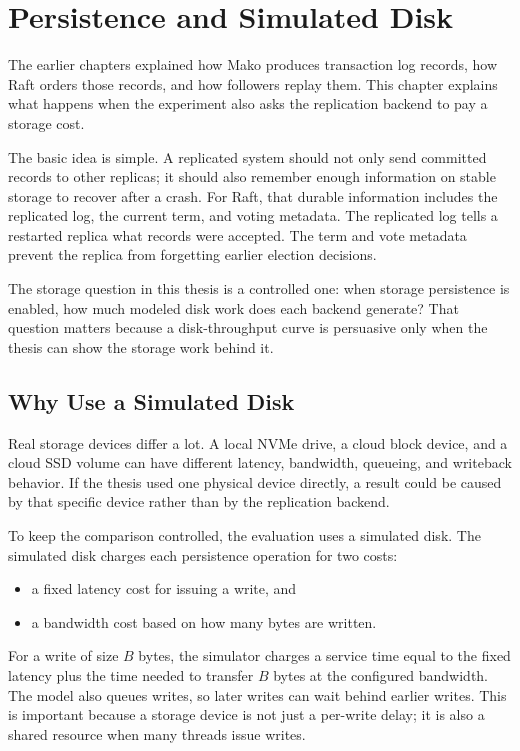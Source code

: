 \chapter{Persistence and Simulated Disk}

The earlier chapters explained how Mako produces transaction log records, how
Raft orders those records, and how followers replay them. This chapter explains
what happens when the experiment also asks the replication backend to pay a
storage cost.

The basic idea is simple. A replicated system should not only send committed
records to other replicas; it should also remember enough information on stable
storage to recover after a crash. For Raft, that durable information includes
the replicated log, the current term, and voting metadata. The replicated log
tells a restarted replica what records were accepted. The term and vote
metadata prevent the replica from forgetting earlier election decisions.

The storage question in this thesis is a controlled one: when storage
persistence is enabled, how much modeled disk work does each backend generate?
That question matters because a disk-throughput curve is persuasive only when
the thesis can show the storage work behind it.

\section{Why Use a Simulated Disk}

Real storage devices differ a lot. A local NVMe drive, a cloud block device,
and a cloud SSD volume can have different latency, bandwidth, queueing, and
writeback behavior. If the thesis used one physical device directly, a result
could be caused by that specific device rather than by the replication backend.

To keep the comparison controlled, the evaluation uses a simulated disk. The
simulated disk charges each persistence operation for two costs:

\begin{itemize}
  \item a fixed latency cost for issuing a write, and
  \item a bandwidth cost based on how many bytes are written.
\end{itemize}

For a write of size \(B\) bytes, the simulator charges a service time equal to
the fixed latency plus the time needed to transfer \(B\) bytes at the configured
bandwidth. The model also queues writes, so later writes can wait behind
earlier writes. This is important because a storage device is not just a
per-write delay; it is also a shared resource when many threads issue writes.

